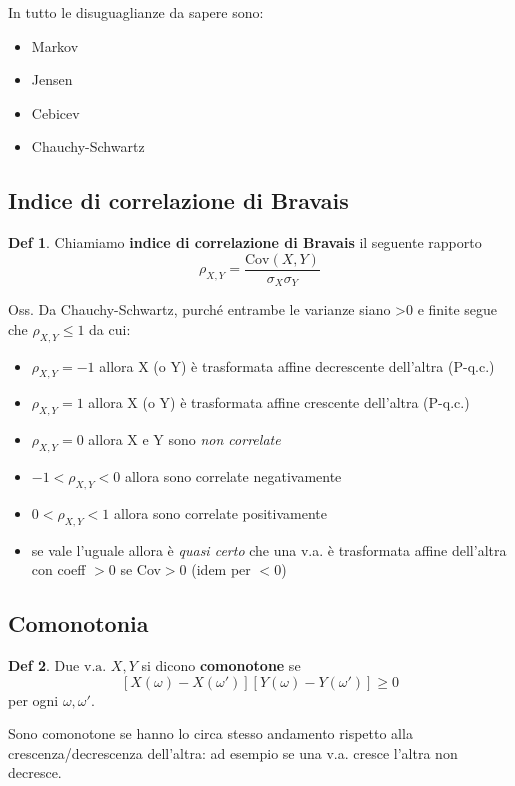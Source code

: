 \documentclass[a4paper,11pt]{article}
\theoremstyle{plain}
\theoremstyle{definition}
\newtheorem{defn}{Def}[section]
\theoremstyle{remark}
\begin{document}
\noindent
In tutto le  disuguaglianze da sapere sono:
\begin{itemize}
    \item Markov
    \item Jensen
    \item Cebicev
    \item Chauchy-Schwartz
\end{itemize}

\subsection{Indice di correlazione di Bravais}
\begin{defn} Chiamiamo \textbf{indice di correlazione di Bravais} il seguente rapporto
$$
\displaystyle \rho_{X,Y} ={\displaystyle \frac {\mathrm{Cov} (X,Y)}{\sigma _{X}\sigma _{Y}}}
$$
\end{defn}

\noindent
Oss. Da Chauchy-Schwartz, purché entrambe le varianze siano >0 e finite segue che $\displaystyle \rho_{X,Y}\leq 1$ da cui:
\begin{itemize}
    \item $\displaystyle \rho_{X,Y}=-1$ allora X (o Y) è trasformata affine decrescente dell'altra (P-q.c.)
    \item $\displaystyle \rho_{X,Y}=1$ allora X (o Y) è trasformata affine crescente dell'altra (P-q.c.)
    \item $\displaystyle \rho_{X,Y}=0$ allora X e Y sono \textit{non correlate}
    \item $-1<\displaystyle \rho_{X,Y}<0$  allora sono correlate negativamente
    \item $0<\displaystyle \rho_{X,Y}<1$ allora sono correlate positivamente
    \item se vale l'uguale allora è \textit{quasi certo} che una v.a. è trasformata affine dell'altra con coeff $>0$ se Cov$>$0 (idem per $<0$)
\end{itemize}

\subsection{Comonotonia}
\begin{defn}Due $\mathrm{v}.\mathrm{a}$. $X, Y$ si dicono \textbf{comonotone} se
$$
[X(\omega)-X(\omega')][Y(\omega)-Y(\omega')]\geq 0
$$
per ogni $\omega, \omega'.$
\end{defn}

\noindent
Sono comonotone se hanno lo circa stesso andamento rispetto alla crescenza/decrescenza  dell'altra: ad esempio se una v.a. cresce l'altra non decresce.
\end{document}
